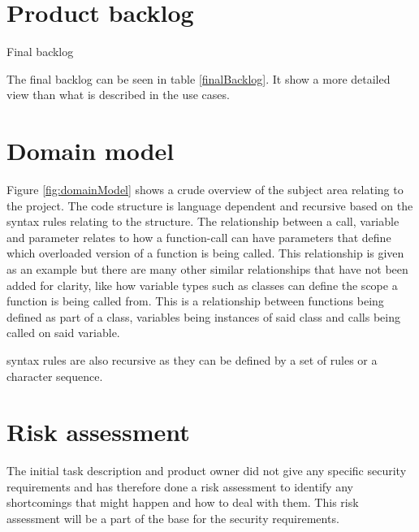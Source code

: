 \section{Product backlog}
\begin{table}
    \caption{Final backlog}
    \label{finalBacklog}
    
\end{table}
The final backlog can be seen in table \ref{finalBacklog}. It show a more detailed view than what is described in the use cases. 

\section{Domain model}


Figure \ref{fig:domainModel} shows a crude overview of the subject area relating to the project. The code structure is language dependent and \gls{recursive} based on the \gls{syntax} rules relating to the structure. The relationship between a call, variable and parameter relates to how a function-call can have parameters that define which overloaded version of a function is being called. This relationship is given as an example but there are many other similar relationships that have not been added for clarity, like how variable types such as classes can define the scope a function is being called from. This is a relationship between functions being defined as part of a class, variables being instances of said class and calls being called on said variable.

\Gls{syntax} rules are also \gls{recursive} as they can be defined by a set of rules or a character sequence.

\section{Risk assessment}
The initial task description and product owner did not give any specific security requirements and has therefore done a risk assessment to identify any shortcomings that might happen and how to deal with them. This risk assessment will be a part of the base for the security requirements.

